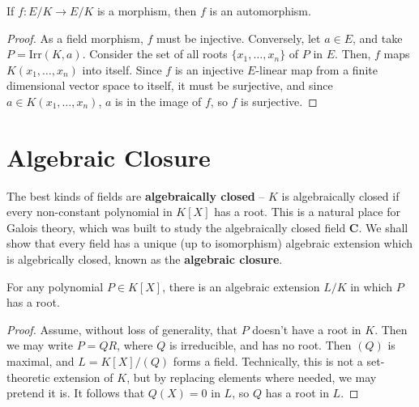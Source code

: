 \begin{corollary}
    If $f: E/K \to E/K$ is a morphism, then $f$ is an automorphism.
\end{corollary}
\begin{proof}
    As a field morphism, $f$ must be injective. Conversely, let $a \in E$, and take $P = \text{Irr}(K,a)$. Consider the set of all roots $\{ x_1, \dots, x_n \}$ of $P$ in $E$. Then, $f$ maps $K(x_1, \dots, x_n)$ into itself. Since $f$ is an injective $E$-linear map from a finite dimensional vector space to itself, it must be surjective, and since $a \in K(x_1, \dots, x_n)$, $a$ is in the image of $f$, so $f$ is surjective.
\end{proof}

\section{Algebraic Closure}

The best kinds of fields are {\bf algebraically closed} -- $K$ is algebraically closed if every non-constant polynomial in $K[X]$ has a root. This is a natural place for Galois theory, which was built to study the algebraically closed field $\mathbf{C}$. We shall show that every field has a unique (up to isomorphism) algebraic extension which is algebrically closed, known as the {\bf algebraic closure}.

\begin{lemma}
    For any polynomial $P \in K[X]$, there is an algebraic extension $L/K$ in which $P$ has a root.
\end{lemma}
\begin{proof}
    Assume, without loss of generality, that $P$ doesn't have a root in $K$. Then we may write $P = QR$, where $Q$ is irreducible, and has no root. Then $(Q)$ is maximal, and $L = K[X]/(Q)$ forms a field. Technically, this is not a set-theoretic extension of $K$, but by replacing elements where needed, we may pretend it is. It follows that $Q(X) = 0$ in $L$, so $Q$ has a root in $L$.
\end{proof}

